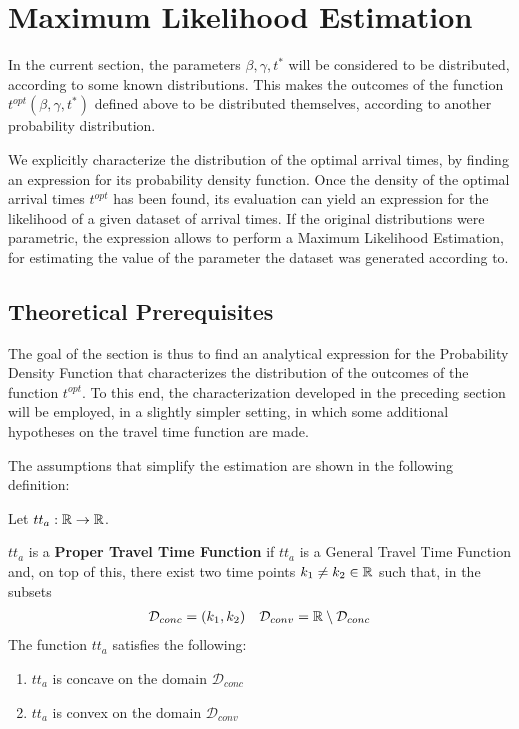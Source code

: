 \section{Maximum Likelihood Estimation}

In the current section,
the parameters \(\beta, \gamma, t^*\) will be considered to be distributed, according to some known distributions.
This makes the outcomes of the function \(t^{opt}(\beta, \gamma, t^*)\) defined above to be distributed themselves,
according to another probability distribution.

We explicitly characterize the distribution of the optimal arrival times,
by finding an expression for its probability density function.
Once the density of the optimal arrival times \(t^{opt}\) has been found,
its evaluation can yield an expression for the likelihood of a given dataset of arrival times.
If the original distributions were parametric,
the expression allows to perform a Maximum Likelihood Estimation,
for estimating the value of the parameter the dataset was generated according to.

\subsection{Theoretical Prerequisites}


The goal of the section is thus to find an analytical expression for the Probability Density Function that characterizes the distribution of the outcomes of the function \(t^{opt}\).
To this end, the characterization developed in the preceding section will be employed,
in a slightly simpler setting, in which some additional hypotheses on the travel time function are made.

The assumptions that simplify the estimation are shown in the following definition:
\begin{definition}
  \label{def:proper_tt}
  Let \(tt_a:\mathbb{R}\rightarrow\mathbb{R}\).

  \(tt_a\) is a \textbf{Proper Travel Time Function} if \(tt_a\) is a General Travel Time Function and,
  on top of this, 
  there exist two time points \(k_1 \neq k_2 \in \mathbb{R}\) such that,
  in the subsets
  \begin{align}
    \label{eq:subs_conc_conv}
    \mathcal{D}_{conc} = (k_1, k_2) && \mathcal{D}_{conv} = \mathbb{R} \setminus \mathcal{D}_{conc}
  \end{align}
  The function \(tt_a\) satisfies the following:
  \begin{enumerate}
  \item \(tt_a\) is concave on the domain \(\mathcal{D}_{conc}\)
  \item \(tt_a\) is convex on the domain \(\mathcal{D}_{conv}\)
  \end{enumerate}
\end{definition}

